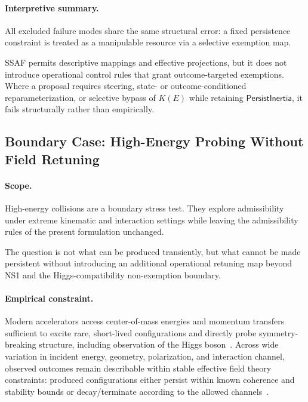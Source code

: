 \documentclass[aps,prx,onecolumn,11pt]{revtex4-2}
\theoremstyle{plain}
\theoremstyle{definition}
\theoremstyle{remark}
\begin{document}
\paragraph{Interpretive summary.}

All excluded failure modes share the same structural error: a fixed
persistence constraint is treated as a manipulable resource via a
selective exemption map.

SSAF permits descriptive mappings and effective projections, but it
does not introduce operational control rules that grant outcome-targeted
exemptions. Where a proposal requires steering, state- or
outcome-conditioned reparameterization, or selective bypass of \(K(E)\)
while retaining \(\mathsf{PersistInertia}\), it fails structurally
rather than empirically.

\subsection{Boundary Case: High-Energy Probing Without Field Retuning}
\label{app:boundary_high_energy}

\paragraph{Scope.}

High-energy collisions are a boundary stress test. They explore
admissibility under extreme kinematic and interaction settings while
leaving the admissibility rules of the present formulation unchanged.

The question is not what can be produced transiently, but what cannot
be made persistent without introducing an additional operational
retuning map beyond NS1 and the Higgs-compatibility non-exemption
boundary.

\paragraph{Empirical constraint.}

Modern accelerators access center-of-mass energies and momentum
transfers sufficient to excite rare, short-lived configurations and
directly probe symmetry-breaking structure, including observation of
the Higgs boson~\cite{ATLAS2012,CMS2012}. Across wide variation in
incident energy, geometry, polarization, and interaction channel,
observed outcomes remain describable within stable effective field
theory constraints: produced configurations either persist within
known coherence and stability bounds or decay/terminate according to
the allowed channels~\cite{PeskinSchroeder,Weinberg1995}.
\end{document}
